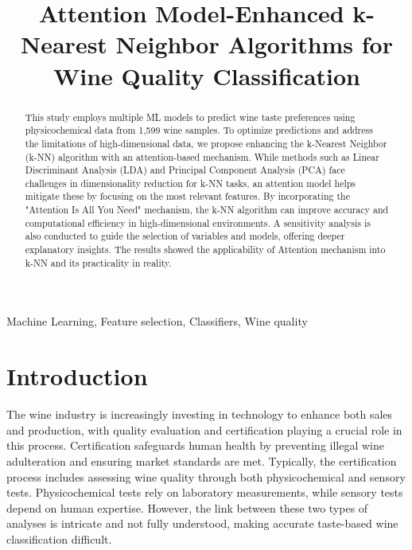 \documentclass[conference]{IEEEtran}
\begin{document}
\title{Attention Model-Enhanced k-Nearest Neighbor Algorithms for Wine Quality Classification}


\author{
}

\maketitle

\begin{abstract}

This study employs multiple ML models to predict wine taste preferences using physicochemical data from 1,599 wine samples. To optimize predictions and address the limitations of high-dimensional data, we propose enhancing the k-Nearest Neighbor (k-NN) algorithm with an attention-based mechanism. While methods such as Linear Discriminant Analysis (LDA) and Principal Component Analysis (PCA) face challenges in dimensionality reduction for k-NN tasks, an attention model helps mitigate these by focusing on the most relevant features. By incorporating the "Attention Is All You Need" mechanism, the k-NN algorithm can improve accuracy and computational efficiency in high-dimensional environments. A sensitivity analysis is also conducted to guide the selection of variables and models, offering deeper explanatory insights. The results showed the applicability of Attention mechanism into k-NN and its practicality in reality. 

\end{abstract}

\begin{IEEEkeywords}
Machine Learning, Feature selection, Classifiers, Wine quality
\end{IEEEkeywords}

\section{Introduction}
The wine industry is increasingly investing in technology to enhance both sales and production, with quality evaluation and certification playing a crucial role in this process. Certification safeguards human health by preventing illegal wine adulteration and ensuring market standards are met. Typically, the certification process includes assessing wine quality through both physicochemical and sensory tests. Physicochemical tests rely on laboratory measurements, while sensory tests depend on human expertise. However, the link between these two types of analyses is intricate and not fully understood, making accurate taste-based wine classification difficult.
\end{document}
